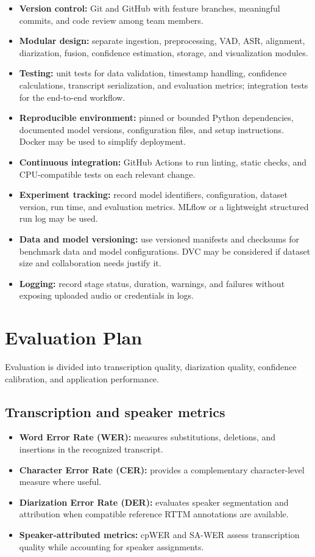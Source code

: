 \documentclass[11pt,a4paper]{article}
\begin{document}
\begin{itemize}
  \item \textbf{Version control:} Git and GitHub with feature branches,
  meaningful commits, and code review among team members.
  \item \textbf{Modular design:} separate ingestion, preprocessing, VAD,
  ASR, alignment, diarization, fusion, confidence estimation, storage,
  and visualization modules.
  \item \textbf{Testing:} unit tests for data validation, timestamp
  handling, confidence calculations, transcript serialization, and
  evaluation metrics; integration tests for the end-to-end workflow.
  \item \textbf{Reproducible environment:} pinned or bounded Python
  dependencies, documented model versions, configuration files, and
  setup instructions. Docker may be used to simplify deployment.
  \item \textbf{Continuous integration:} GitHub Actions to run linting,
  static checks, and CPU-compatible tests on each relevant change.
  \item \textbf{Experiment tracking:} record model identifiers,
  configuration, dataset version, run time, and evaluation metrics.
  MLflow or a lightweight structured run log may be used.
  \item \textbf{Data and model versioning:} use versioned manifests and
  checksums for benchmark data and model configurations. DVC may be
  considered if dataset size and collaboration needs justify it.
  \item \textbf{Logging:} record stage status, duration, warnings, and
  failures without exposing uploaded audio or credentials in logs.
\end{itemize}

\section{Evaluation Plan}

Evaluation is divided into transcription quality, diarization quality,
confidence calibration, and application performance.

\subsection{Transcription and speaker metrics}

\begin{itemize}
  \item \textbf{Word Error Rate (WER):} measures substitutions,
  deletions, and insertions in the recognized transcript.
  \item \textbf{Character Error Rate (CER):} provides a complementary
  character-level measure where useful.
  \item \textbf{Diarization Error Rate (DER):} evaluates speaker
  segmentation and attribution when compatible reference RTTM annotations
  are available.
  \item \textbf{Speaker-attributed metrics:} cpWER and SA-WER assess
  transcription quality while accounting for speaker assignments.
\end{itemize}
\end{document}
